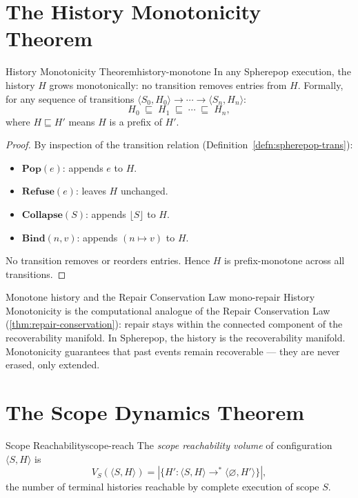 \documentclass[12pt,twoside,openright]{book}
\begin{document}
\section{The History Monotonicity Theorem}

\begin{theorem}{History Monotonicity Theorem}{history-monotone}
  In any Spherepop execution, the history $H$ grows
  monotonically: no transition removes entries from $H$.
  Formally, for any sequence of transitions
  $\langle S_0, H_0 \rangle \to \cdots \to
  \langle S_n, H_n \rangle$:
  \[
    H_0 \;\sqsubseteq\; H_1 \;\sqsubseteq\;
    \cdots \;\sqsubseteq\; H_n,
  \]
  where $H \sqsubseteq H'$ means $H$ is a prefix of $H'$.
\end{theorem}

\begin{proof}
  By inspection of the transition relation
  (Definition~\ref{defn:spherepop-trans}):
  \begin{itemize}[nosep]
    \item $\mathbf{Pop}(e)$: appends $e$ to $H$.
    \item $\mathbf{Refuse}(e)$: leaves $H$ unchanged.
    \item $\mathbf{Collapse}(S)$: appends $\lfloor S \rfloor$
          to $H$.
    \item $\mathbf{Bind}(n,v)$: appends $(n \mapsto v)$
          to $H$.
  \end{itemize}
  No transition removes or reorders entries. Hence $H$
  is prefix-monotone across all transitions.
\end{proof}

\begin{remark}{Monotone history and the Repair Conservation Law}%
  {mono-repair}
  History Monotonicity is the computational analogue of
  the Repair Conservation Law
  (\cref{thm:repair-conservation}): repair stays within
  the connected component of the recoverability manifold.
  In Spherepop, the history is the recoverability manifold.
  Monotonicity guarantees that past events remain
  recoverable — they are never erased, only extended.
\end{remark}

\section{The Scope Dynamics Theorem}

\begin{definition}{Scope Reachability}{scope-reach}
  The \emph{scope reachability volume} of configuration
  $\langle S, H \rangle$ is
  \[
    V_S(\langle S, H \rangle)
    = |\{H' : \langle S, H \rangle \to^* \langle \varnothing, H' \rangle\}|,
  \]
  the number of terminal histories reachable by complete
  execution of scope $S$.
\end{definition}
\end{document}
